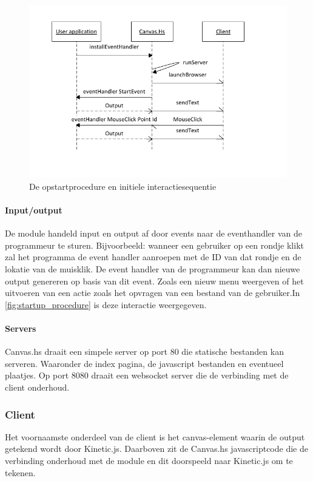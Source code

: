 \begin{figure}
\begin{center}
\includegraphics[keepaspectratio,width=\textwidth]{./images/module_startup_procedure_interaction.pdf}
\caption{De opstartprocedure en initiele interactiesequentie}
\label{fig:startup_procedure}
\end{center}
\end{figure}


\paragraph{Input/output}
De module handeld input en output af door events naar de eventhandler van de programmeur te sturen. Bijvoorbeeld: wanneer een gebruiker op een rondje klikt zal het programma de event handler aanroepen met de ID van dat rondje en de lokatie van de muisklik. De event handler van de programmeur kan dan nieuwe output genereren op basis van dit event. Zoals een nieuw menu weergeven of het uitvoeren van een actie zoals het opvragen van een bestand van de gebruiker.In \autoref{fig:startup_procedure} is deze interactie weergegeven. 

\paragraph{Servers}
Canvas.hs draait een simpele server op port 80 die statische bestanden kan serveren. Waaronder de index pagina, de javascript bestanden en eventueel plaatjes. Op port 8080 draait een websocket server die de verbinding met de client onderhoud.


\subsubsection{Client}
Het voornaamste onderdeel van de client is het canvas-element waarin de output getekend wordt door Kinetic.js. Daarboven zit de Canvas.hs javascriptcode die de verbinding onderhoud met de module en dit doorspeeld naar Kinetic.js om te tekenen.

